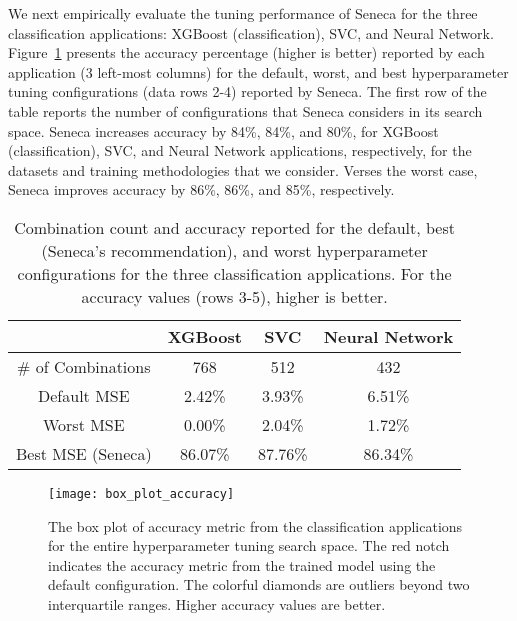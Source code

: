 
We next empirically evaluate the tuning performance of Seneca for the three
classification applications: XGBoost (classification), SVC, and Neural Network.
Figure~\ref{fig:accuracy} presents the accuracy percentage (higher is better) 
reported by each application (3 left-most columns) 
for the default, worst, and best hyperparameter tuning 
configurations (data rows 2-4) reported by Seneca.  
The first row of the table
reports the number of configurations that Seneca considers in its search space.
Seneca increases accuracy by 84\%, 84\%, and 80\%, for XGBoost (classification), 
SVC, and Neural Network applications,
respectively, for the datasets and training methodologies that we consider.
Verses the worst case, Seneca improves accuracy by 86\%, 86\%, and 85\%, respectively.


\begin{table}
\centering
\begin{tabular}{|c|c|c|c|}
\hline
& XGBoost & SVC & Neural Network\\
\hline
\# of Combinations & 768 & 512 & 432\\
\hline
\hline
Default MSE&2.42\%&3.93\%&6.51\%\\
\hline
Worst MSE&0.00\%&2.04\%&1.72\%\\
\hline
Best MSE (Seneca) &86.07\%&87.76\%&86.34\%\\
\hline
\end{tabular}
\caption{Combination count and accuracy reported for the 
default, best (Seneca's recommendation), and worst hyperparameter configurations for 
the three classification applications.  
For the accuracy  values (rows 3-5), higher is better.
\label{fig:accuracy}}
\end{table}

\begin{figure}[t] \centering 
\texttt{[image: box\_plot\_accuracy]}
\caption{The box plot of accuracy metric 
from the classification applications for the entire hyperparameter tuning search space. 
The red notch indicates the accuracy metric from the trained model using the default configuration. 
The colorful diamonds are outliers beyond two interquartile ranges. Higher accuracy values are better.
\label{fig:box_plot_accuracy}}
\end{figure}


